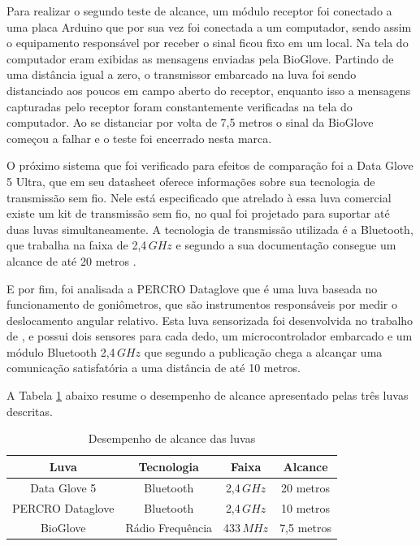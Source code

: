 \documentclass[
	12pt,				%
	openright,			%
	oneside,			%
	a4paper,			%
	english,			%
	brazil				%
	]{abntex2}
\begin{document}
		Para realizar o segundo teste de alcance, um módulo receptor foi conectado a uma placa Arduino que por sua vez foi conectada a um computador, sendo assim o equipamento responsável por receber o sinal ficou fixo em um local. Na tela do computador eram exibidas as mensagens enviadas pela BioGlove. Partindo de uma distância igual a zero, o transmissor embarcado na luva foi sendo distanciado aos poucos em campo aberto do receptor, enquanto isso a mensagens capturadas pelo receptor foram constantemente verificadas na tela do computador. Ao se distanciar por volta de 7,5 metros o sinal da BioGlove começou a falhar e o teste foi encerrado nesta marca. 

			O próximo sistema que foi verificado para efeitos de comparação foi a Data Glove 5 Ultra, que em seu datasheet oferece informações sobre sua tecnologia de transmissão sem fio. Nele está especificado que atrelado à essa luva comercial existe um kit de transmissão sem fio, no qual foi projetado para suportar até duas luvas simultaneamente. A tecnologia de transmissão utilizada é a Bluetooth, que trabalha na faixa de 2,4$\,GHz$ e segundo a sua documentação consegue um alcance de até 20 metros \cite{5DT-ultra}.

			E por fim, foi analisada a PERCRO Dataglove que é uma luva baseada no funcionamento de goniômetros, que são instrumentos responsáveis por medir o deslocamento angular relativo. Esta luva sensorizada foi desenvolvida no trabalho de \cite{rodriguez2007goniometric}, e possui dois sensores para cada dedo, um microcontrolador embarcado e um módulo Bluetooth 2,4$\,GHz$ que segundo a publicação chega a alcançar uma comunicação satisfatória a uma distância de até 10 metros.


			A Tabela \ref{Tab:wifi-range} abaixo resume o desempenho de alcance apresentado pelas três luvas descritas.

		\begin{table}[H]
  	\centering
		\caption{Desempenho de alcance das luvas}
    \begin{tabular}{c|c|c|c}
      \midrule
			Luva 						& Tecnologia			&	Faixa		& Alcance		\\
      \midrule                                            					
			Data Glove 5		& Bluetooth				& 2,4$\,GHz$	& 20 metros	\\
			PERCRO Dataglove& Bluetooth				& 2,4$\,GHz$	& 10 metros	\\
			BioGlove				& Rádio Frequência& 433$\,MHz$	&	7,5 metros\\	
      \midrule
    \end{tabular}
		\label{Tab:wifi-range}
		\end{table}
\end{document}
